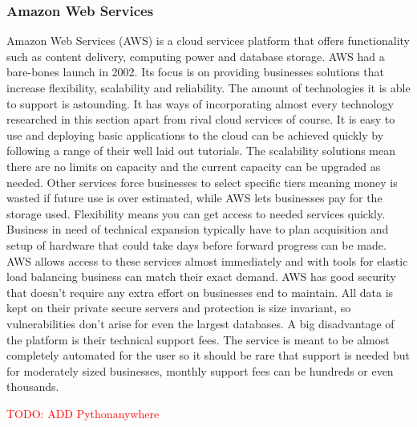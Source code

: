 \documentclass[12pt]{article}
\begin{document}
        \subsubsection{Amazon Web Services}
Amazon Web Services (AWS) is a cloud services platform that offers functionality such as content delivery, computing power and database storage\cite{technologyAwsQuote}. AWS had a bare-bones launch in 2002. Its focus is on providing businesses solutions that increase flexibility, scalability and reliability.\bigbreak 
\noindent
The amount of technologies it is able to support is astounding. It has ways of incorporating almost every technology researched in this section apart from rival cloud services of course. It is easy to use and deploying basic applications to the cloud can be achieved quickly by following a range of their well laid out tutorials. The scalability solutions mean there are no limits on capacity and the current capacity can be upgraded as needed. Other services force businesses to select specific tiers meaning money is wasted if future use is over estimated, while AWS lets businesses pay for the storage used.\bigbreak 
\noindent
Flexibility means you can get access to needed services quickly. Business in need of technical expansion typically have to plan acquisition and setup of hardware that could take days before forward progress can be made. AWS allows access to these services almost immediately and with tools for elastic load balancing business can match their exact demand.\bigbreak 
\noindent
AWS has good security that doesn’t require any extra effort on businesses end to maintain. All data is kept on their private secure servers and protection is size invariant, so vulnerabilities don’t arise for even the largest databases.\bigbreak 
\noindent
A big disadvantage of the platform is their technical support fees. The service is meant to be almost completely automated for the user so it should be rare that support is needed but for moderately sized businesses, monthly support fees can be hundreds or even thousands. 

    \textcolor{red}{TODO: ADD Pythonanywhere}
\end{document}
